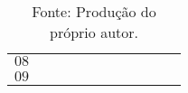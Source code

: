\documentclass[10pt, a4paper]{article}
\newcommand{\Cor}{\cellcolor[HTML]{E5E5E5}}
\begin{document}
\begin{table}[htbp]
\begin{tabular}{|*{11}{c|}}
                    & \Cor
                    & \Cor
                    &
                    \\ \hline
                \Cor $08$
                    & & & & & & &
                    & \Cor
                    & \Cor
                    & \Cor
                    \\ \hline
                \Cor $09$
                    & & & & & &
                    & \Cor
                    & \Cor
                    & \Cor
                    & \Cor
                    \\ \hline
            \end{tabular}
            \caption*{Fonte: Produção do próprio autor.}    %
            \label{Tab-Cronograma}
        \end{table}


    \newpage
    
    
    
\end{document}
